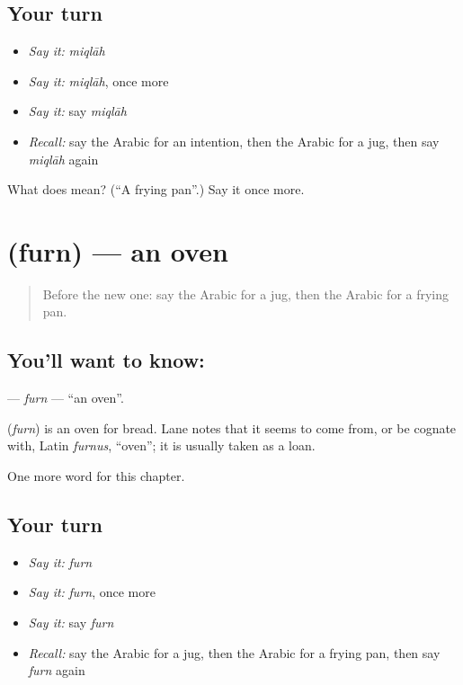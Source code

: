 \subsection*{Your turn}
\begin{itemize}
\raggedright
  \item \emph{Say it:} \emph{miqlāh}
  \item \emph{Say it:} \emph{miqlāh}, once more
  \item \emph{Say it:} say \emph{miqlāh}
  \item \emph{Recall:} say the Arabic for an intention, then the Arabic for a jug, then say \emph{miqlāh} again
\end{itemize}

\begin{tcolorbox}[breakable,colback=teal!4,colframe=teal!35!black,title={Before you move on}]
What does  mean? (\textquotedblleft{}A frying pan\textquotedblright{}.) Say it once more.
\end{tcolorbox}
\section[\texorpdfstring{\ar{فرن} (furn)}{فرن (furn)}]{ (furn) — an oven}

\label{lesson:AR-C116-furn}



\begin{quote}
Before the new one: say the Arabic for a jug, then the Arabic for a frying pan.
\end{quote}

\subsection*{You'll want to know: }
\textbf{} — \emph{furn} — \textquotedblleft{}an oven\textquotedblright{}.

\begin{cousinweb}
\textbf{} (\emph{furn}) is an oven for bread. Lane notes that it seems to come from, or be cognate with, Latin \emph{furnus}, \textquotedblleft{}oven\textquotedblright{}; it is usually taken as a loan.
\end{cousinweb}

\begin{grammarlens}[title={What you've built}]
One more word for this chapter.
\end{grammarlens}

\subsection*{Your turn}
\begin{itemize}
\raggedright
  \item \emph{Say it:} \emph{furn}
  \item \emph{Say it:} \emph{furn}, once more
  \item \emph{Say it:} say \emph{furn}
  \item \emph{Recall:} say the Arabic for a jug, then the Arabic for a frying pan, then say \emph{furn} again
\end{itemize}

